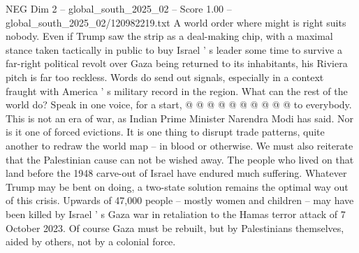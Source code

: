 \begin{textsample}{NEG Dim 2 – global\_south\_2025\_02 – Score 1.00 – global\_south\_2025\_02/120982219.txt}
A world order where might is right suits nobody.
Even if Trump saw the strip as a deal-making chip, with a maximal stance taken tactically in public to buy Israel ' s leader some time to survive a far-right political revolt over Gaza being returned to its inhabitants, his Riviera pitch is far too reckless.
Words do send out signals, especially in a context fraught with America ' s military record in the region.
What can the rest of the world do?
Speak in one voice, for a start, @ @ @ @ @ @ @ @ @ @ to everybody.
This is not an era of war, as Indian Prime Minister Narendra Modi has said.
Nor is it one of forced evictions.
It is one thing to disrupt trade patterns, quite another to redraw the world map -- in blood or otherwise.
We must also reiterate that the Palestinian cause can not be wished away.
The people who lived on that land before the 1948 carve-out of Israel have endured much suffering.
Whatever Trump may be bent on doing, a two-state solution remains the optimal way out of this crisis.
Upwards of 47,000 people -- mostly women and children -- may have been killed by Israel ' s Gaza war in retaliation to the Hamas terror attack of 7 October 2023.
Of course Gaza must be rebuilt, but by Palestinians themselves, aided by others, not by a colonial force.

\end{textsample}

